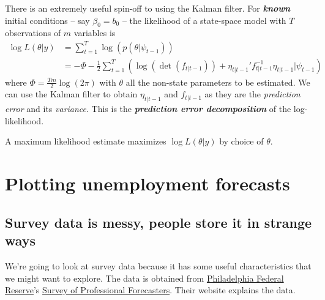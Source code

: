 \documentclass[
  letterpaper,
]{book}
\begin{document}
There is an extremely useful spin-off to using the Kalman filter. For
\textbf{\emph{known}} initial conditions -- say \(\beta_0 = b_0\) -- the
likelihood of a state-space model with \(T\) observations of \(m\)
variables is \begin{align}
\log L(\theta | y) &= \sum_{t=1}^T \log \left(p (\theta | \psi_{t-1})\right) \\
  &= - \Phi - \frac{1}{2}\sum_{t=1}^T \left( \log(\det(f_{t|t-1})) + \eta_{t|t-1}' f_{t|t-1}^{-1} \eta_{t|t-1} | \psi_{t-1} \right)
\end{align} where \(\Phi = \frac{Tm}{2}\log \left( 2\pi \right)\) with
\(\theta\) all the non-state parameters to be estimated. We can use the
Kalman filter to obtain \(\eta_{t|t-1}\) and \(f_{t|t-1}\) as they are
the \emph{prediction error} and its \emph{variance}. This is the
\textbf{\emph{prediction error decomposition}} of the log-likelihood.

A maximum likelihood estimate maximizes \(\log L(\theta | y)\) by choice
of \(\theta\).

\hypertarget{plotting-unemployment-forecasts}{%
\chapter{Plotting unemployment
forecasts}\label{plotting-unemployment-forecasts}}

\hypertarget{survey-data-is-messy-people-store-it-in-strange-ways}{%
\section{Survey data is messy, people store it in strange
ways}\label{survey-data-is-messy-people-store-it-in-strange-ways}}

We're going to look at survey data because it has some useful
characteristics that we might want to explore. The data is obtained from
\href{https://www.philadelphiafed.org/}{Philadelphia Federal Reserve}'s
\href{https://www.philadelphiafed.org/research-and-data/real-time-center/survey-of-professional-forecasters}{Survey
of Professional Forecasters}. Their website explains the data.
\end{document}

